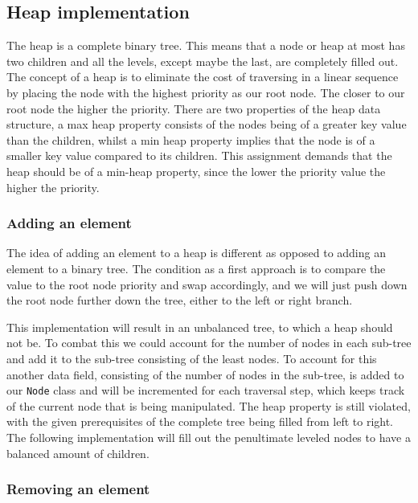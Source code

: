 \documentclass[a4paper,11pt]{article}
\begin{document}
    \subsection*{Heap implementation}

        The heap is a complete binary tree. This means that a node or heap at most has two children and all the levels, except maybe the last, are completely filled out. The concept of a heap is to eliminate the cost of traversing in a linear sequence by placing the node with the highest priority as our root node. The closer to our root node the higher the priority. There are two properties of the heap data structure, a max heap property consists of the nodes being of a greater key value than the children, whilst a min heap property implies that the node is of a smaller key value compared to its children. This assignment demands that the heap should be of a min-heap property, since the lower the priority value the higher the priority. 

        \subsubsection*{Adding an element}

            The idea of adding an element to a heap is different as opposed to adding an element to a binary tree. The condition as a first approach is to compare the value to the root node priority and swap accordingly, and we will just push down the root node further down the tree, either to the left or right branch.
            
            This implementation will result in an unbalanced tree, to which a heap should not be. To combat this we could account for the number of nodes in each sub-tree and add it to the sub-tree consisting of the least nodes. To account for this another data field, consisting of the number of nodes in the sub-tree, is added to our \texttt{Node} class and will be incremented for each traversal step, which keeps track of the current node that is being manipulated. The heap property is still violated, with the given prerequisites of the complete tree being filled from left to right. The following implementation will fill out the penultimate leveled nodes to have a balanced amount of children. 

        \subsubsection*{Removing an element}
\end{document}
